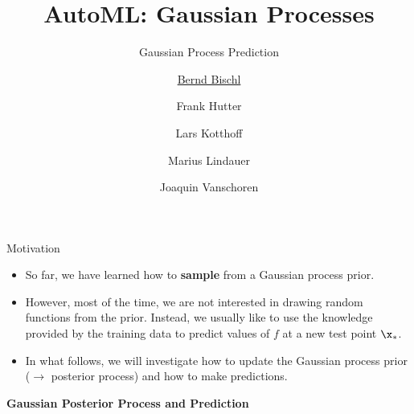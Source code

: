 



\newcommand{\lz}{\vspace{0.5cm}}
\newcommand{\thetab}{\bm{\weights}}
\newcommand{\zero}{\mathbf{0}}
\newcommand{\Xmat}{\mathbf{X}}
\newcommand{\ydat}{\mathbf{y}}
\newcommand{\id}{\boldsymbol{I}}
\newcommand{\Amat}{\mathbf{A}}
\newcommand{\Xspace}{\mathcal{X}}                                           
\newcommand{\Yspace}{\mathcal{Y}}
\newcommand{\ls}{\ell}
\newcommand{\natnum}{\mathbb{N}}
\newcommand{\intnum}{\mathbb{Z}}
\newcommand{\Kmat}{\bm{K}}


\usepackage{fontawesome}
\usepackage{dirtytalk}
\usepackage{csquotes}

\def\argmin{\mathop{\sf arg\,min}}   






\title[AutoML: GPs]{AutoML: Gaussian Processes} %
\subtitle{Gaussian Process Prediction} %
\author[Marius Lindauer]{\underline{Bernd Bischl} \and Frank Hutter \and Lars Kotthoff\newline \and Marius Lindauer \and Joaquin Vanschoren}
\institute{}
\date{}





\maketitle



\begin{frame}[c]{Motivation}

\begin{itemize}

\item So far, we have learned how to \textbf{sample} from a Gaussian process prior.
\lz
\item However, most of the time, we are not interested in drawing random functions from the prior. Instead, we usually like to use the knowledge provided by the training data to predict values of $f$ at a new test point $\x_*$. 
\lz
\item In what follows, we will investigate how to update the Gaussian process prior ($\to$ posterior process) and how to make predictions.


\end{itemize}


\end{frame}
\begin{frame}[c]{}
\centering
\huge
\textbf{Gaussian Posterior Process and Prediction}
\end{frame}



